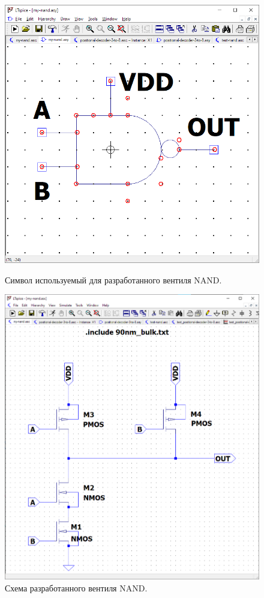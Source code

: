 \begin{figure}[htb]
    \centering
    \begin{minipage}[b]{0.4\textwidth}
        \includegraphics[width=\textwidth]{res/nand_symbol.png}
        \caption{Символ используемый для разработанного вентиля NAND.}
        \label{fig:nand-symbol}
    \end{minipage}
    \hfill
    \begin{minipage}[b]{0.5\textwidth}
        \includegraphics[width=\textwidth]{res/nand_circuit.png}
        \caption{Схема разработанного вентиля NAND.}
        \label{fig:nand-circuit}
    \end{minipage}
\end{figure}

